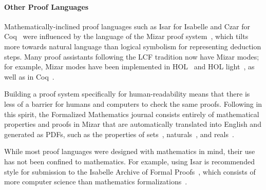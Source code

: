 
\paragraph{Other Proof Languages}

Mathematically-inclined proof languages such as Isar for Isabelle and Czar for Coq~\citep{Corbineau2008} were influenced by the language of the Mizar proof system~\citep{trybulec1985computer}, which tilts more towards natural language than logical symbolism for representing deduction steps. Many proof assistants following the LCF tradition now have Mizar modes; for example, Mizar modes have been implemented in HOL~\citep{harrison-mizar} and HOL light~\citep{wiedijk2001mizar}, as well as in Coq~\citep{giero2003mmode}.

Building a proof system specifically for human-readability means that there is less of a barrier for humans and computers to check the same proofs.
Following in this spirit, the Formalized Mathematics journal consists entirely of mathematical properties and proofs in 
Mizar that are automatically translated into English and generated as PDFs, such as the properties of sets~\citep{darmochwal1990finite},
naturals~\citep{bancerek1990fundamental}, and reals~\citep{JFR1411}.

While most proof languages were designed with mathematics in mind, their use has not been confined to mathematics.
For example, using
Isar %
is recommended style for submission to the Isabelle Archive of Formal Proofs~\citep{isabelleafp},
which consists of more computer science than mathematics formalizations~\citep{Blanchette2015}.

